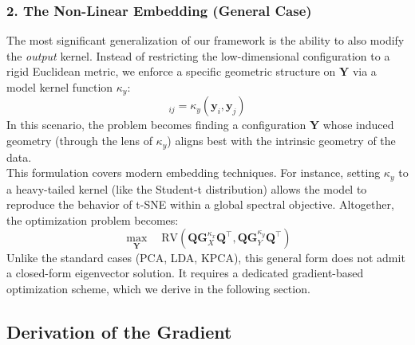 \documentclass[11pt]{article}
\begin{document}
	\subsubsection*{2. The Non-Linear Embedding (General Case)}
	The most significant generalization of our framework is the ability to also modify the \emph{output} kernel. Instead of restricting the low-dimensional configuration to a rigid Euclidean metric, we enforce a specific geometric structure on $\mathbf{Y}$ via a model kernel function $\kappa_y$:
	\begin{equation}
		[\mathbf{G}^{\kappa_y}_Y]_{ij} = \kappa_y(\mathbf{y}_i, \mathbf{y}_j)
	\end{equation}
	In this scenario, the problem becomes finding a configuration $\mathbf{Y}$ whose induced geometry (through the lens of $\kappa_y$) aligns best with the intrinsic geometry of the data. \\
	
	This formulation covers modern embedding techniques. For instance, setting $\kappa_y$ to a heavy-tailed kernel (like the Student-t distribution) allows the model to reproduce the behavior of t-SNE within a global spectral objective. Altogether, the optimization problem becomes:
	\begin{equation}
		\max_{\mathbf{Y}} \quad \text{RV}\left( \mathbf{Q} \mathbf{G}^{\kappa_x}_X \mathbf{Q}^\top, \mathbf{Q} \mathbf{G}^{\kappa_y}_Y \mathbf{Q}^\top \right)
	\end{equation}
	Unlike the standard cases (PCA, LDA, KPCA), this general form does not admit a closed-form eigenvector solution. It requires a dedicated gradient-based optimization scheme, which we derive in the following section.
	
	
	\subsection{Derivation of the Gradient}
	\label{subsec:gradient}
	
\end{document}
